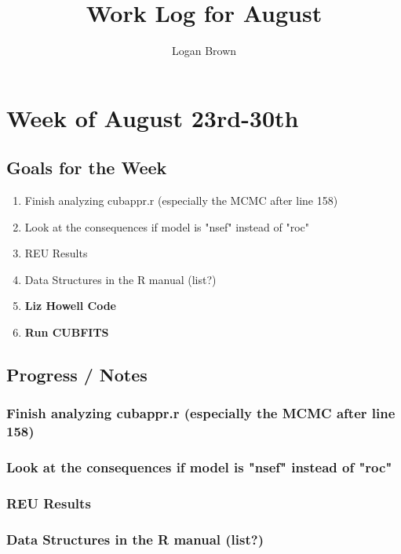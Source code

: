 \documentclass[11pt]{article} %
\title{Work Log for August}
\author{Logan Brown}
\begin{document}
\maketitle


\setcounter{section}{03} %
\setcounter{subsection}{-1}
\setcounter{subsubsection}{0}

\section{Week of August 23rd-30th}
\subsection{Goals for the Week}
\begin{enumerate}
\item Finish analyzing cubappr.r (especially the MCMC after line 158)
\item Look at the consequences if model is "nsef" instead of "roc"
\item REU Results
\item Data Structures in the R manual (list?)
\item \textbf{Liz Howell Code}
\item \textbf{Run CUBFITS}
\end{enumerate}

\subsection{Progress / Notes}

\subsubsection{Finish analyzing cubappr.r (especially the MCMC after line 158)}

\subsubsection{Look at the consequences if model is "nsef" instead of "roc"}

\subsubsection{REU Results}

\subsubsection{Data Structures in the R manual (list?)}
\end{document}
